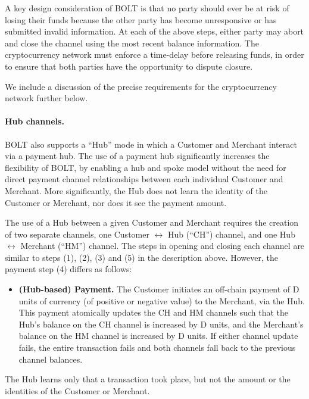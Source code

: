 \documentclass[11pt]{report}
\begin{document}
A key design consideration of BOLT is that no party should ever be at risk of losing their funds because the other party has become unresponsive or has submitted invalid information. At each of the above steps, either party may abort and close the channel using the most recent balance information. The cryptocurrency network must enforce a time-delay before releasing funds, in order to ensure that both parties have the opportunity to dispute closure. 

We include a discussion of the precise requirements for the cryptocurrency network further below.

\paragraph{Hub channels.} BOLT also supports a ``Hub'' mode in which a Customer and Merchant interact via a payment hub. The use of a payment hub significantly increases the flexibility of BOLT, by enabling a hub and spoke model without the need for direct payment channel relationships between each individual Customer and Merchant. More significantly, the Hub does not learn the identity of the Customer or Merchant, nor does it see the payment amount.

The use of a Hub between a given Customer and Merchant requires the creation of two separate channels, one Customer $\longleftrightarrow$ Hub (``CH'') channel, and one Hub $\longleftrightarrow$ Merchant (``HM'') channel. The steps in opening and closing each channel are similar to steps (1), (2), (3) and (5) in the description above. However, the payment step (4) differs as follows:

\begin{itemize}
\item {\bf (Hub-based) Payment.} The Customer initiates an off-chain payment of D units of currency (of positive or negative value) to the Merchant, via the Hub. This payment atomically updates the CH and HM channels such that the Hub's balance on the CH channel is increased by D units, and the Merchant's balance on the HM channel is increased by D units. If either channel update fails, the entire transaction fails and both channels fall back to the previous channel balances.
\end{itemize}

The Hub learns only that a transaction took place, but not the amount or the identities of the Customer or Merchant.


{\normalsize

}
\rhead{}
\end{document}
